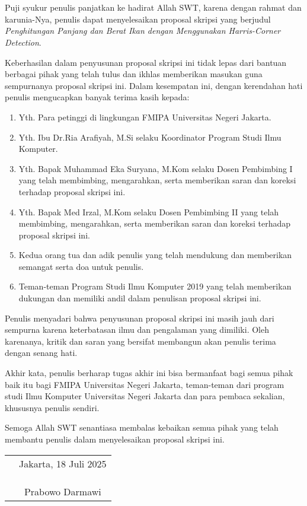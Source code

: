 \chapter*{}

Puji syukur penulis panjatkan ke hadirat Allah SWT, karena dengan rahmat dan
karunia-Nya, penulis dapat menyelesaikan proposal skripsi yang berjudul
\textit{Penghitungan Panjang dan Berat Ikan dengan Menggunakan Harris-Corner Detection}.

Keberhasilan dalam penyusunan proposal skripsi ini tidak lepas dari bantuan
berbagai pihak yang telah tulus dan ikhlas memberikan masukan guna sempurnanya proposal skripsi ini. Dalam kesempatan ini, dengan
kerendahan hati penulis mengucapkan banyak terima kasih kepada:

\begin{enumerate}
	\item Yth. Para petinggi di lingkungan FMIPA Universitas Negeri Jakarta.
	\item Yth. Ibu Dr.Ria Arafiyah, M.Si selaku Koordinator Program Studi Ilmu Komputer.
	\item Yth. Bapak Muhammad Eka Suryana, M.Kom selaku Dosen Pembimbing I yang telah membimbing, mengarahkan, serta memberikan saran dan koreksi terhadap proposal skripsi ini.
	\item Yth. Bapak Med Irzal, M.Kom selaku Dosen Pembimbing II yang telah membimbing, mengarahkan, serta memberikan saran dan koreksi terhadap proposal skripsi ini.
	\item Kedua orang tua dan adik penulis yang telah mendukung dan memberikan semangat serta doa untuk penulis.
	\item Teman-teman Program Studi Ilmu Komputer 2019 yang telah memberikan dukungan dan memiliki andil dalam penulisan proposal skripsi ini.
\end{enumerate}

Penulis menyadari bahwa penyusunan proposal skripsi ini masih jauh dari sempurna
karena keterbatasan ilmu dan pengalaman yang dimiliki. Oleh karenanya, kritik
dan saran yang bersifat membangun akan penulis terima dengan senang hati. 

Akhir kata, penulis berharap tugas akhir ini bisa bermanfaat bagi semua pihak baik itu bagi FMIPA Universitas Negeri Jakarta, teman-teman dari program studi Ilmu
Komputer Universitas Negeri Jakarta dan para pembaca sekalian, khususnya penulis sendiri.

Semoga Allah SWT senantiasa membalas kebaikan semua pihak yang telah membantu penulis dalam menyelesaikan proposal skripsi ini.

\vspace{2cm}

\begin{tabular}{p{7.5cm}c}
	&Jakarta, 18 Juli 2025 \\
	&\\
	&\\
	&\\
	&Prabowo Darmawi
\end{tabular}
